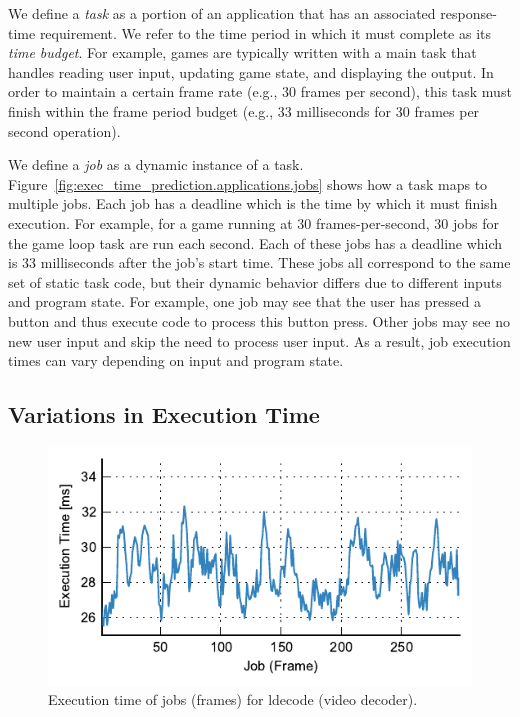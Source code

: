 We define a \emph{task} as a portion of an application that has an associated
response-time requirement. We refer to the time period in which it must
complete as its \emph{time budget}. For example, games are typically written
with a main task that handles reading user input, updating game state, and
displaying the output. In order to maintain a certain frame rate (e.g., 30
frames per second), this task must finish within the frame period budget (e.g.,
33 milliseconds for 30 frames per second operation).

We define a \emph{job} as a dynamic instance of a task.
Figure~\ref{fig:exec_time_prediction.applications.jobs} shows how a task maps
to multiple jobs. Each job has a deadline which is the time by which it must
finish execution. For example, for a game running at 30 frames-per-second, 30
jobs for the game loop task are run each second. Each of these jobs has a
deadline which is 33 milliseconds after the job's start time. These jobs all
correspond to the same set of static task code, but their dynamic behavior
differs due to different inputs and program state. For example, one job may see
that the user has pressed a button and thus execute code to process this button
press. Other jobs may see no new user input and skip the need to process user
input.  As a result, job execution times can vary depending on input and
program state.

\subsection{Variations in Execution Time}

\begin{figure}
  \begin{center}
    \includegraphics{exec_time_prediction/figs/ldecode_time.pdf}
    \caption{Execution time of jobs (frames) for ldecode (video decoder).}
    \label{fig:exec_time_prediction.applications.ldecode_time}
  \end{center}
\end{figure}

